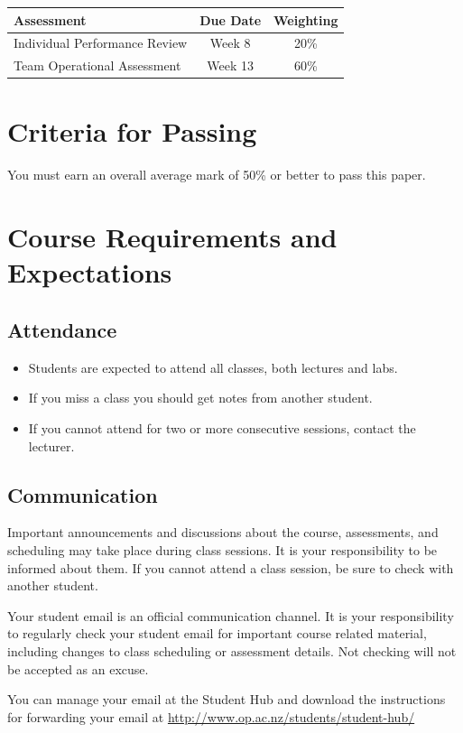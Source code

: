 \documentclass{article}
\begin{document}
\begin{tabular}{|l|c|c|}
\hline
Assessment & Due Date & Weighting \\ \hline
Individual Performance Review & Week 8 & 20\% \\ \hline
Team Operational Assessment & Week 13 & 60\% \\ \hline
\end{tabular}


\section*{Criteria for Passing}
You must earn an overall average mark of 50\% or better to pass this paper.

\section*{Course Requirements and Expectations}
\subsection*{Attendance}
\begin{itemize}
 \item Students are expected to attend all classes, both lectures and labs.
 \item If you miss a class you should get notes from another student.
 \item If you cannot attend for two or more consecutive sessions, contact the lecturer.
\end{itemize}

\subsection*{Communication}
Important announcements and discussions about the course, assessments, and scheduling may take place during class sessions.  It is your responsibility to be informed about them.  If you cannot attend a class session, be sure to check with another student.

Your student email is an official communication channel. It is your responsibility to regularly check your student email for important course related material, including changes to class scheduling or assessment details. Not checking will not be accepted as an excuse.

You can manage your email at the Student Hub and download the instructions for forwarding your email at \url{http://www.op.ac.nz/students/student-hub/}
\end{document}
